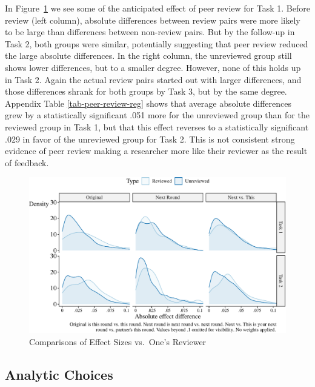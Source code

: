 \documentclass[
  letterpaper,
  DIV=11,
  numbers=noendperiod]{scrartcl}
\begin{document}
In Figure~\ref{fig-like-your-reviewer} we see some of the anticipated
effect of peer review for Task 1. Before review (left column), absolute
differences between review pairs were more likely to be large than
differences between non-review pairs. But by the follow-up in Task 2,
both groups were similar, potentially suggesting that peer review
reduced the large absolute differences. In the right column, the
unreviewed group still shows lower differences, but to a smaller degree.
However, none of this holds up in Task 2. Again the actual review pairs
started out with larger differences, and those differences shrank for
both groups by Task 3, but by the same degree. Appendix Table
\ref{tab-peer-review-reg} shows that average absolute differences grew
by a statistically significant .051 more for the unreviewed group than
for the reviewed group in Task 1, but that this effect reverses to a
statistically significant .029 in favor of the unreviewed group for Task
2. This is not consistent strong evidence of peer review making a
researcher more like their reviewer as the result of feedback.

\begin{figure}

{\centering \includegraphics{The-Sources-of-Researcher-Variation-in-Economics_files/figure-pdf/fig-like-your-reviewer-1.pdf}

}

\caption{\label{fig-like-your-reviewer}Comparisons of Effect Sizes
vs.~One's Reviewer}

\end{figure}

\hypertarget{sec-analytic}{%
\subsection{Analytic Choices}\label{sec-analytic}}
\end{document}
